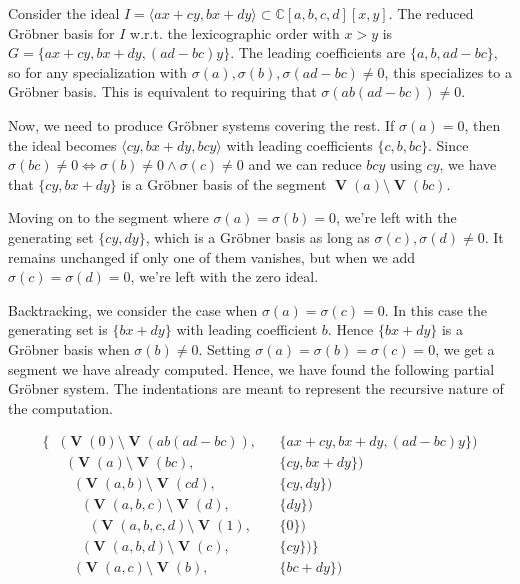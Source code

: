 \documentclass[a4paper, 12pt]{article}
\newcommand{\C}{\mathbb{C}}
\DeclareMathOperator{\V}{\mathbf V}
\theoremstyle{changedot}
\theoremstyle{changedotbreak}
\theoremstyle{nonumberplain}
\begin{document}
\begin{example}\upshape
  Consider the ideal $I = \langle ax + cy, bx + dy \rangle \subset \C[a, b, c, d][x, y]$. The reduced Gröbner basis for $I$ w.r.t. the lexicographic order with $x > y$ is $G = \{ax + cy, bx + dy, (ad - bc)y\}$. The leading coefficients are $\{a, b, ad - bc\}$, so for any specialization with $\sigma(a), \sigma(b), \sigma(ad - bc) \neq 0$, this specializes to a Gröbner basis. This is equivalent to requiring that $\sigma(ab(ad-bc)) \neq 0$.

  Now, we need to produce Gröbner systems covering the rest. If $\sigma(a) = 0$, then the ideal becomes $\langle cy, bx + dy, bcy \rangle$ with leading coefficients $\{c, b, bc\}$. Since $\sigma(bc) \neq 0 \iff \sigma(b) \neq 0 \land \sigma(c) \neq 0$ and we can reduce $bcy$ using $cy$, we have that $\{cy, bx + dy\}$ is a Gröbner basis of the segment $\V(a) \setminus \V(bc)$.

  Moving on to the segment where $\sigma(a) = \sigma(b) = 0$, we're left with the generating set $\{cy, dy\}$, which is a Gröbner basis as long as $\sigma(c), \sigma(d) \neq 0$. It remains unchanged if only one of them vanishes, but when we add $\sigma(c) = \sigma(d) = 0$, we're left with the zero ideal.

  Backtracking, we consider the case when $\sigma(a) = \sigma(c) = 0$. In this case the generating set is $\{bx + dy\}$ with leading coefficient $b$. Hence $\{bx + dy\}$ is a Gröbner basis when $\sigma(b) \neq 0$. Setting $\sigma(a) = \sigma(b) = \sigma(c) = 0$, we get a segment we have already computed. Hence, we have found the following partial Gröbner system. The indentations are meant to represent the recursive nature of the computation.

  \begin{align*}
    \{&(\V(0) \setminus \V(ab(ad-bc)),& &\{ax + cy, bx + dy, (ad-bc)y\}) \\
      &\;\; (\V(a) \setminus \V(bc),& &\{cy, bx + dy\}) \\
      &\;\; \;\;(\V(a, b) \setminus \V(cd),& &\{cy, dy\}) \\
      &\;\; \;\; \;\;(\V(a, b, c) \setminus \V(d),& &\{dy\}) \\
      &\;\; \;\; \;\; \;\;(\V(a, b, c, d) \setminus \V(1),& &\{0\}) \\
      &\;\; \;\; \;\;(\V(a, b, d) \setminus \V(c),& &\{cy\})\}\\
      &\;\; \;\;(\V(a, c) \setminus \V(b), &&\{bc + dy\})
  \end{align*}


\end{example}
\end{document}
